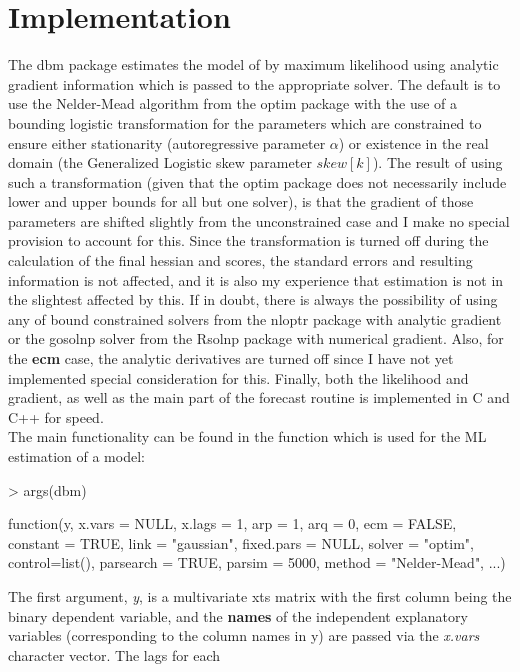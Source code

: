 \section{Implementation}\label{sec:implementation}
The dbm package estimates the model of \cite{Kauppi2008} by maximum likelihood using analytic gradient information which is passed to the appropriate solver.
The default is to use the Nelder-Mead algorithm from the optim package with the use of a bounding logistic transformation for the parameters which are constrained
to ensure either stationarity (autoregressive parameter $\alpha$) or existence in the real domain (the Generalized Logistic skew parameter
$skew[k]$).
The result of using such a transformation (given that the optim package does not necessarily include lower and upper bounds for all but one solver), is that the gradient of
those parameters are shifted slightly from the unconstrained case and I make no special provision to account for this. Since the transformation is turned off
during the calculation of the final hessian and scores, the standard errors and resulting information is not affected, and it is also my experience that
estimation is not in the slightest affected by this. If in doubt, there is always the possibility of using any of bound constrained solvers from the nloptr package
with analytic gradient or the gosolnp solver from the Rsolnp package with numerical gradient. Also, for the \textbf{ecm} case, the analytic derivatives are turned
off since I have not yet implemented special consideration for this. Finally, both the likelihood and gradient, as well as the main part of the forecast routine is
implemented in C and C++ for speed.\\
The main functionality can be found in the \verb@dbm@ function which is used for the ML estimation of a model:
\begin{Schunk}
\begin{Sinput}
> args(dbm)
\end{Sinput}
\begin{Soutput}
function(y, x.vars = NULL, x.lags = 1, arp = 1, arq = 0, ecm = FALSE,
	constant = TRUE, link = "gaussian", fixed.pars = NULL,
	solver = "optim", control=list(), parsearch = TRUE, parsim = 5000,
	method = "Nelder-Mead", ...)
\end{Soutput}
\end{Schunk}
The first argument, \emph{y}, is a multivariate xts matrix with the first column being the binary dependent variable, and the \textbf{names} of the
independent explanatory variables (corresponding to the column names in y) are passed via the \emph{x.vars} character vector. The lags for each
